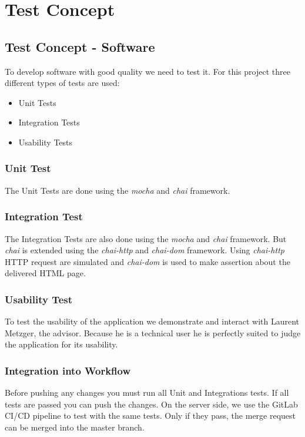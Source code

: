 \chapter{Test Concept}

\section{Test Concept - Software}
To develop software with good quality we need to test it.
For this project three different types of tests are used:

\begin{itemize}
  \item Unit Tests
  \item Integration Tests
  \item Usability Tests
\end{itemize}

\subsection{Unit Test}
The Unit Tests are done using the \textit{mocha} and \textit{chai} framework.

\subsection{Integration Test}
The Integration Tests are also done using the \textit{mocha} and \textit{chai} framework.
But \textit{chai} is extended using the \textit{chai-http} and \textit{chai-dom} framework.
Using \textit{chai-http} HTTP request are simulated and \textit{chai-dom} is used to make assertion about the delivered HTML page.

\subsection{Usability Test}
To test the usability of the application we demonstrate and interact with Laurent Metzger, the advisor.
Because he is a technical user he is perfectly suited to judge the application for its usability.

\subsection{Integration into Workflow}
Before pushing any changes you must run all Unit and Integrations tests.
If all tests are passed you can push the changes.
On the server side, we use the GitLab CI/CD pipeline to test with the same tests.
Only if they pass, the merge request can be merged into the master branch.

